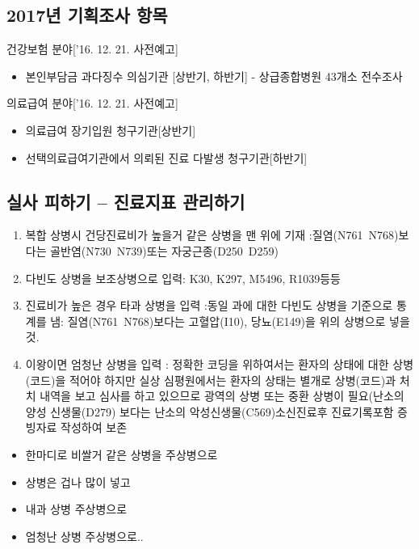 \subsection{2017년 기획조사 항목}
건강보험 분야[’16. 12. 21. 사전예고]
\begin{itemize}\tightlist
\item 본인부담금 과다징수 의심기관 [상반기, 하반기] - 상급종합병원 43개소 전수조사
\end{itemize}
의료급여 분야[’16. 12. 21. 사전예고]
\begin{itemize}\tightlist
\item 의료급여 장기입원 청구기관[상반기]
\item 선택의료급여기관에서 의뢰된 진료 다발생 청구기관[하반기]
\end{itemize}

\subsection{실사 피하기 – 진료지표 관리하기}
\begin{enumerate}[해결책1.]\tightlist
\item 복합 상병시 건당진료비가 높을거 같은 상병을 맨 위에 기재
:질염(N761~N768)보다는 골반염(N730~N739)또는 자궁근종(D250~D259) 
\item 다빈도 상병을 보조상병으로 입력: K30, K297, M5496, R1039등등
\item  진료비가 높은 경우 타과 상병을 입력 
 :동일 과에 대한 다빈도 상병을 기준으로 통계를 냄: 질염(N761~N768)보다는 고혈압(I10), 당뇨(E149)을 위의 상병으로 넣을것.
\item 이왕이면 엄청난 상병을 입력
: 정확한 코딩을 위하여서는 환자의 상태에 대한 상병(코드)을 적어야 하지만 실상 
	심평원에서는 환자의 상태는 별개로 상병(코드)과  처치 내역을 보고 심사를 
	하고 있으므로 광역의  상병 또는 중환 상병이 필요(난소의 양성 신생물(D279)
	보다는 난소의 악성신생물(C569)소신진료후 진료기록포함 증빙자료 작성하여
	보존
\end{enumerate}
\begin{commentbox}{}
\begin{itemize}\tightlist 
\item 한마디로 비쌀거 같은 상병을 주상병으로 
\item 상병은 겁나 많이 넣고 
\item 내과 상병  주상병으로 
\item 엄청난 상병 주상병으로..
\end{itemize}
\end{commentbox}

